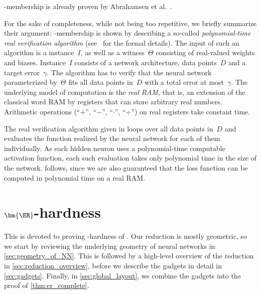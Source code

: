 \ER-membership is already proven by Abrahamsen et al.~\cite{Abrahamsen2021_NeuralNetworks}.


For the sake of completeness, while not being too repetitive, we
%
briefly
summarize their argument:
\ER-membership is shown by describing a so-called \emph{polynomial-time real verification algorithm} (see~\cite{Erickson2022_SmoothingTheGap} for the formal details).
The input of such an algorithm is a \trainNN instance~$I$, as well as a witness~$\Theta$ consisting of real-valued weights and biases.
Instance~$I$ consists of a network architecture, data points~$D$ and a target error~$\gamma$.
The algorithm has to verify that the neural network parameterized by~$\Theta$ fits all data points in~$D$ with a total error at most~$\gamma$.
The underlying model of computation is the \emph{real RAM}, that is, an extension of the classical word RAM by registers that can store arbitrary real numbers.
Arithmetic operations (\enquote{$+$}, \enquote{$-$}, \enquote{$\cdot$}, \enquote{$\div$}) on real registers take constant time.

%
The real verification algorithm given in \cite{Abrahamsen2021_NeuralNetworks}
%
%
%
%
%
loops over all data points in~$D$ and evaluates the function realized by the neural network for each of them individually.
As each hidden neuron uses a polynomial-time computable activation function, each such evaluation takes only polynomial time in the size of the network.
 follows, since we are also guaranteed that the loss function can be computed in polynomial time on a real RAM.




\section{\texorpdfstring{$\bm{{\ER}}$}{ER}-hardness}
\label{sec:hardness}

This  is devoted to proving \ER-hardness of \trainNN.
Our reduction is mostly geometric, so we start by reviewing the underlying geometry of \twolayer neural networks in \cref{sec:geometry_of_NN}.
This is followed by a high-level overview of the reduction in \cref{sec:reduction_overview}, before we describe the gadgets in detail in \cref{sec:gadgets}.
Finally, in \cref{sec:global_layout}, we combine the gadgets into the proof of \cref{thm:er_complete}.


